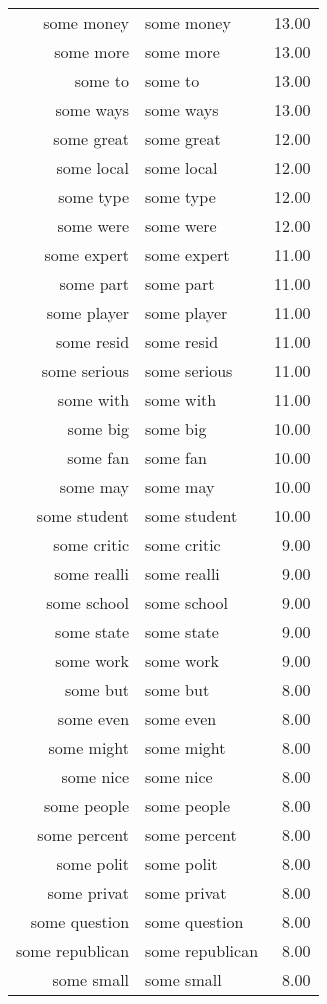 \begin{table}[ht]
\begin{tabular}{rlr}
  some money & some money & 13.00 \\ 
  some more & some more & 13.00 \\ 
  some to & some to & 13.00 \\ 
  some ways & some ways & 13.00 \\ 
  some great & some great & 12.00 \\ 
  some local & some local & 12.00 \\ 
  some type & some type & 12.00 \\ 
  some were & some were & 12.00 \\ 
  some expert & some expert & 11.00 \\ 
  some part & some part & 11.00 \\ 
  some player & some player & 11.00 \\ 
  some resid & some resid & 11.00 \\ 
  some serious & some serious & 11.00 \\ 
  some with & some with & 11.00 \\ 
  some big & some big & 10.00 \\ 
  some fan & some fan & 10.00 \\ 
  some may & some may & 10.00 \\ 
  some student & some student & 10.00 \\ 
  some critic & some critic & 9.00 \\ 
  some realli & some realli & 9.00 \\ 
  some school & some school & 9.00 \\ 
  some state & some state & 9.00 \\ 
  some work & some work & 9.00 \\ 
  some but & some but & 8.00 \\ 
  some even & some even & 8.00 \\ 
  some might & some might & 8.00 \\ 
  some nice & some nice & 8.00 \\ 
  some people & some people & 8.00 \\ 
  some percent & some percent & 8.00 \\ 
  some polit & some polit & 8.00 \\ 
  some privat & some privat & 8.00 \\ 
  some question & some question & 8.00 \\ 
  some republican & some republican & 8.00 \\ 
  some small & some small & 8.00 \\ 

\end{tabular}
\end{table}

